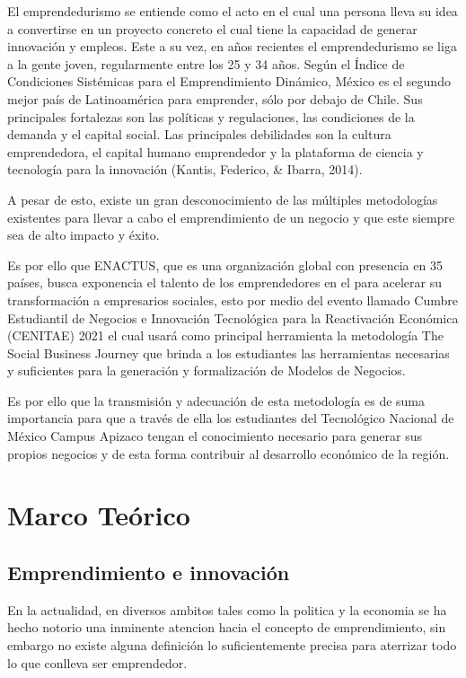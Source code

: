 \documentclass[11pt]{article}
\begin{document}
El emprendedurismo se entiende como el acto en el cual una persona lleva su idea a convertirse en un proyecto concreto el cual tiene la capacidad de generar innovación y empleos. Este a su vez, en años recientes el emprendedurismo se liga a la gente joven, regularmente entre los 25 y 34 años. Según el Índice de Condiciones Sistémicas para el Emprendimiento Dinámico, México es el segundo mejor país de Latinoamérica para emprender, sólo por debajo de Chile. Sus principales fortalezas son las políticas y regulaciones, las condiciones de la demanda y el capital social. Las principales debilidades son la cultura emprendedora, el capital humano emprendedor y la plataforma de ciencia y tecnología para la innovación (Kantis, Federico, \& Ibarra, 2014).

A pesar de esto, existe un gran desconocimiento de las múltiples metodologías existentes para llevar a cabo el emprendimiento de un negocio y que este siempre sea de alto impacto y éxito.

Es por ello que ENACTUS, que es una organización global con presencia en 35 países, busca exponencia el talento de los emprendedores en el para acelerar su transformación a empresarios sociales, esto por medio del evento llamado Cumbre Estudiantil de Negocios e Innovación Tecnológica para la Reactivación Económica (CENITAE) 2021 el cual usará como principal herramienta la metodología The Social Business Journey que brinda a los estudiantes las herramientas necesarias y suficientes para la generación y formalización de Modelos de Negocios.

Es por ello que la transmisión y adecuación de esta metodología es de suma importancia para que a través de ella los estudiantes del Tecnológico Nacional de México Campus Apizaco tengan el conocimiento necesario para generar sus propios negocios y de esta forma contribuir al desarrollo económico de la región.

\section{Marco Teórico}
\label{sec:orgcb99459}

\subsection{Emprendimiento e innovación}
\label{sec:org9d5f0b3}


En la actualidad, en diversos ambitos tales como la politica y la economia se ha hecho notorio una inminente atencion hacia el concepto de emprendimiento, sin embargo no existe alguna definición lo suficientemente precisa para aterrizar todo lo que conlleva ser emprendedor.
\end{document}
